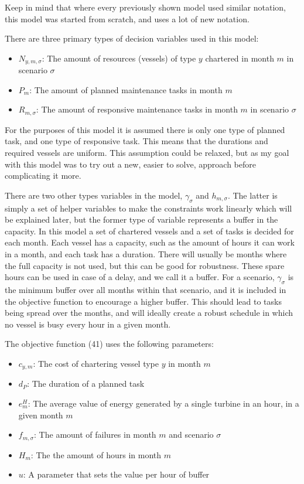 \documentclass[a4paper,12pt]{article}
\begin{document}
Keep in mind that where every previously shown model used similar notation, this model was started from scratch, and uses a lot of new notation. 

There are three primary types of decision variables used in this model:

\begin{itemize}
\item $N_{y,m,\sigma}$: The amount of resources (vessels) of type $y$ chartered in month $m$ in scenario $\sigma$
\item $P_m$: The amount of planned maintenance tasks in month $m$
\item $R_{m,\sigma}$: The amount of responsive maintenance tasks in month $m$ in scenario $\sigma$
\end{itemize}

For the purposes of this model it is assumed there is only one type of planned task, and one type of responsive task. This means that the durations and required vessels are uniform. This assumption could be relaxed, but as my goal with this model was to try out a new, easier to solve, approach before complicating it more. 

There are two other types variables in the model, $\gamma_\sigma$ and $h_{m,\sigma}$. The latter is simply a set of helper variables to make the constraints work linearly which will be explained later, but the former type of variable represents a buffer in the capacity. In this model a set of chartered vessels and a set of tasks is decided for each month. Each vessel has a capacity, such as the amount of hours it can work in a month, and each task has a duration. There will usually be months where the full capacity is not used, but this can be good for robustness. These spare hours can be used in case of a delay, and we call it a buffer. For a scenario, $\gamma_\sigma$ is the minimum buffer over all months within that scenario, and it is included in the objective function to encourage a higher buffer. This should lead to tasks being spread over the months, and will ideally create a robust schedule in which no vessel is busy every hour in a given month. 

The objective function (41) uses the following parameters:

\begin{itemize}
\item $c_{y,m}$: The cost of chartering vessel type $y$ in month $m$
\item $d_P$: The duration of a planned task 
\item $e^H_m$: The average value of energy generated by a single turbine in an hour, in a given month $m$
\item $f_{m,\sigma}$: The amount of failures in month $m$ and scenario $\sigma$
\item $H_m$: The the amount of hours in month $m$
\item $u$: A parameter that sets the value per hour of buffer
\end{itemize}
\end{document}
